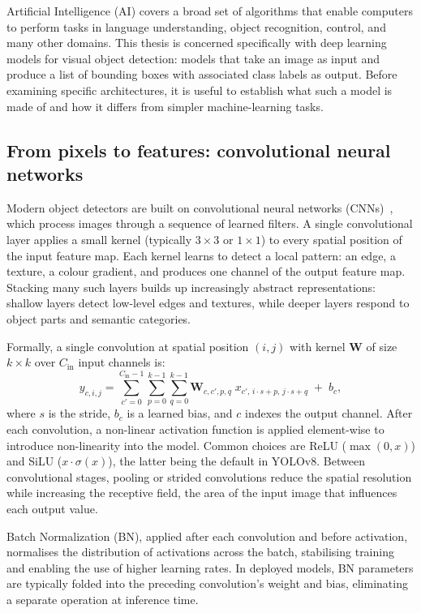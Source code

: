 \documentclass[12pt,a4paper]{report}
\begin{document}
Artificial Intelligence (AI) covers a broad set of algorithms that enable computers to perform tasks in language
understanding, object recognition, control, and many other domains.
This thesis is concerned specifically with deep learning models for visual object detection: models that take an image
as input and produce a list of bounding boxes with associated class labels as output.
Before examining specific architectures, it is useful to establish what such a model is made of and how it differs
from simpler machine-learning tasks.

\subsection*{From pixels to features: convolutional neural networks}

Modern object detectors are built on convolutional neural networks (CNNs)~\cite{krizhevsky2012imagenet},
which process images through a sequence of learned filters.
A single convolutional layer applies a small kernel (typically $3\times3$ or $1\times1$) to every spatial position of
the input feature map.
Each kernel learns to detect a local pattern: an edge, a texture, a colour gradient, and produces one channel of the
output feature map.
Stacking many such layers builds up increasingly abstract representations: shallow layers detect low-level edges and
textures, while deeper layers respond to object parts and semantic categories.

Formally, a single convolution at spatial position $(i, j)$ with kernel $\mathbf{W}$ of size $k \times k$ over
$C_{\mathrm{in}}$ input channels is:
\[
  y_{c,i,j} = \sum_{c'=0}^{C_{\mathrm{in}}-1}\sum_{p=0}^{k-1}\sum_{q=0}^{k-1}
  \mathbf{W}_{c,c',p,q}\; x_{c',\,i \cdot s + p,\,j \cdot s + q} \;+\; b_c,
\]
where $s$ is the stride, $b_c$ is a learned bias, and $c$ indexes the output channel.
After each convolution, a non-linear activation function is applied element-wise to introduce non-linearity
into the model.
Common choices are ReLU ($\max(0, x)$) and SiLU ($x \cdot \sigma(x)$), the latter being the default in YOLOv8.
Between convolutional stages, pooling or strided convolutions reduce the spatial resolution while increasing
the receptive field, the area of the input image that influences each output value.

Batch Normalization (BN), applied after each convolution and before activation, normalises the distribution of
activations across the batch, stabilising training and enabling the use of higher learning rates.
In deployed models, BN parameters are typically folded into the preceding convolution's weight and bias, eliminating
a separate operation at inference time.
\end{document}
